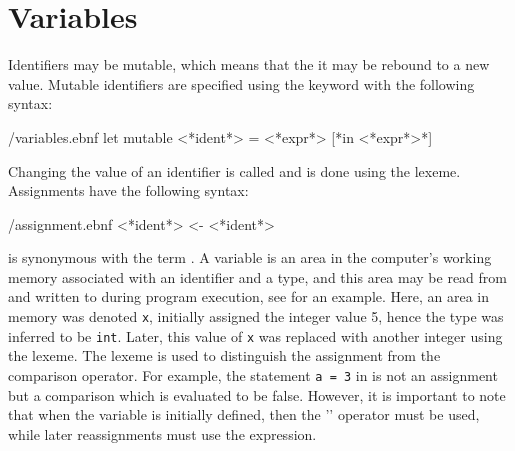 \section{Variables}
\label{sec:mutableValues}
Identifiers may be mutable, which means that the it may be rebound to a new value. Mutable identifiers are specified using the  keyword with the following syntax:
%
\begin{verbatimwrite}{\ebnf/variables.ebnf}
let mutable <*ident*> = <*expr*> [*in <*expr*>*]
\end{verbatimwrite}
%
Changing the value of an identifier is called  and is done using the \idx[{<-}@\lstinline{<-}]{\lexeme{<-}} lexeme. Assignments have the following syntax:
%
\begin{verbatimwrite}{\ebnf/assignment.ebnf}
<*ident*> <- <*ident*>
\end{verbatimwrite}
%
 is synonymous with the term . A variable is an area in the computer's working memory associated with an identifier and a type, and this area may be read from and written to during program execution, see  for an example.
%
%
Here, an area in memory was denoted \lstinline{x}, initially assigned the integer value 5, hence the type was inferred to be \lstinline|int|.  Later, this value of \lstinline{x} was replaced with another integer using the \lexeme{<-} lexeme. The \lexeme{<-} lexeme is used to distinguish the assignment from the comparison operator. For example, the statement \lstinline{a = 3} in  is not an assignment but a comparison which is evaluated to be false. 
%
%
%
However, it is important to note that when the variable is initially defined, then the '\lexeme{=}' operator must be used, while later reassignments must use the \lexeme{<-} expression.

